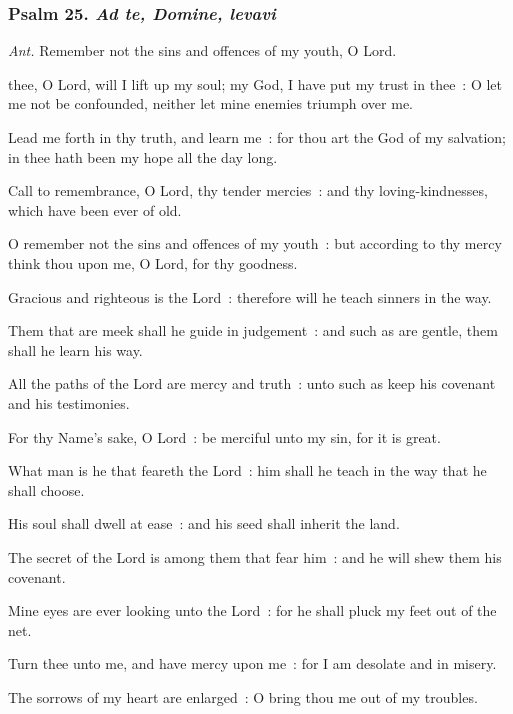 \subsubsection{Psalm 25. \textit{Ad te, Domine, levavi}}\par\noindent
\textit{Ant.} Remember not {\dag} the sins and offences of my youth, O Lord.\par
{} thee, O Lord, will I lift up my soul; my God, I have put my trust in thee~: O let me not be confounded, neither let mine enemies triumph over me.\par
{}
Lead me forth in thy truth, and learn me~: for thou art the God of my salvation; in thee hath been my hope all the day long.\par
{}Call to remembrance, O Lord, thy tender mercies~: and thy loving-kindnesses, which have been ever of old.\par
{}O remember not the sins and offences of my youth~: but according to thy mercy think thou upon me, O Lord, for thy goodness.\par
{}Gracious and righteous is the Lord~: therefore will he teach sinners in the way.\par
{}Them that are meek shall he guide in judgement~: and such as are gentle, them shall he learn his way.\par
{}All the paths of the Lord are mercy and truth~: unto such as keep his covenant and his testimonies.\par
{}For thy Name's sake, O Lord~: be merciful unto my sin, for it is great.\par
{}What man is he that feareth the Lord~: him shall he teach in the way that he shall choose.\par
{}His soul shall dwell at ease~: and his seed shall inherit the land.\par
{}The secret of the Lord is among them that fear him~: and he will shew them his covenant.\par
{}Mine eyes are ever looking unto the Lord~: for he shall pluck my feet out of the net.\par
{}Turn thee unto me, and have mercy upon me~: for I am desolate and in misery.\par
{}The sorrows of my heart are enlarged~: O bring thou me out of my troubles.\par
